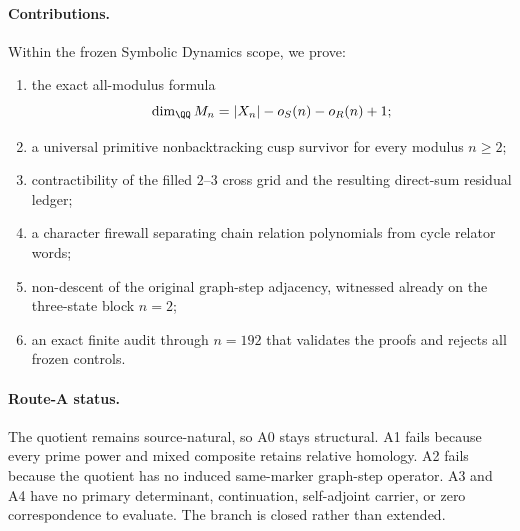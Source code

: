 \paragraph{Contributions.}
Within the frozen Symbolic Dynamics scope, we prove:
\begin{enumerate}
  \item the exact all-modulus formula
  \[
    \dim_\QQ M_n=|X_n|-o_S(n)-o_R(n)+1;
  \]
  \item a universal primitive nonbacktracking cusp survivor for every
  modulus $n\ge2$;
  \item contractibility of the filled $2$--$3$ cross grid and the resulting
  direct-sum residual ledger;
  \item a character firewall separating chain relation polynomials from cycle
  relator words;
  \item non-descent of the original graph-step adjacency, witnessed already
  on the three-state block $n=2$;
  \item an exact finite audit through $n=192$ that validates the proofs and
  rejects all frozen controls.
\end{enumerate}

\paragraph{Route-A status.}
The quotient remains source-natural, so A0 stays structural.  A1 fails because
every prime power and mixed composite retains relative homology.  A2 fails
because the quotient has no induced same-marker graph-step operator.  A3 and
A4 have no primary determinant, continuation, self-adjoint carrier, or zero
correspondence to evaluate.  The branch is closed rather than extended.
